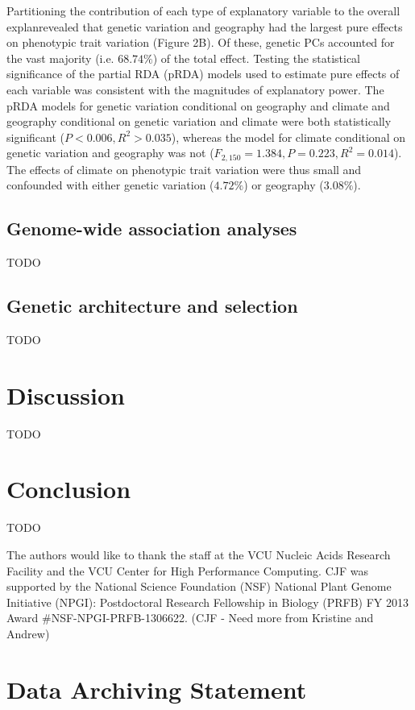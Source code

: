 \documentclass[smallextended]{svjour3}
\begin{document}
Partitioning the contribution of each type of explanatory variable to the overall
explanrevealed that
genetic variation and geography had the largest pure effects on phenotypic trait
variation (Figure 2B). Of these, genetic PCs accounted for the vast majority
(i.e. $68.74\%$) of the total effect. Testing the statistical significance of
the partial RDA (pRDA) models used to estimate pure effects of each variable was
consistent with the magnitudes of explanatory power. The pRDA models for genetic
variation conditional on geography and climate and geography conditional on
genetic variation and climate were both statistically significant ($P < 0.006,
R^2 > 0.035$), whereas the model for climate conditional on genetic variation
and geography was not ($F_{2,150} = 1.384, P = 0.223, R^2 = 0.014$). The effects
of climate on phenotypic trait variation were thus small and confounded with
either genetic variation ($4.72\%$) or geography ($3.08\%$).


\subsection*{Genome-wide association analyses}
TODO

\subsection*{Genetic architecture and selection}
TODO

\section*{Discussion}
TODO


\section*{Conclusion}
TODO


\begin{acknowledgements} The authors would like to thank the staff at
the VCU Nucleic Acids Research Facility and the
VCU Center for High Performance Computing.  CJF was supported by the National
Science Foundation (NSF) National Plant Genome Initiative (NPGI): Postdoctoral
Research Fellowship in Biology (PRFB) FY 2013 Award \#NSF-NPGI-PRFB-1306622.
(CJF - Need more from Kristine and Andrew)
\end{acknowledgements}

\section*{Data Archiving Statement}
\end{document}
